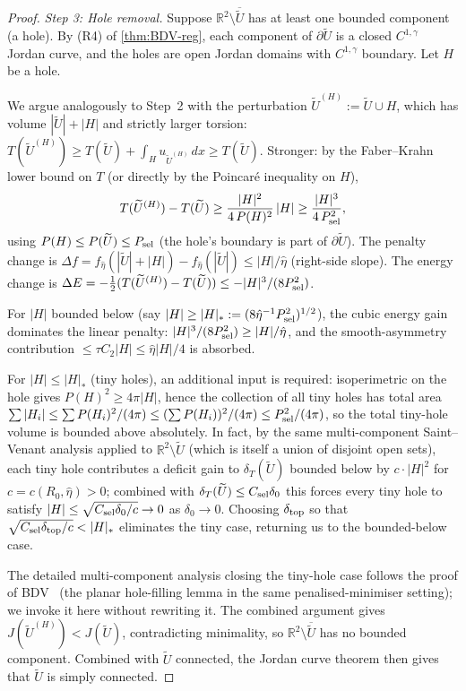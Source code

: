 \documentclass[11pt]{amsart}
\newcommand{\R}{\mathbb R}
\newcommand{\dT}{\delta_T}
\newcommand{\wt}{\widetilde}
\begin{document}
\begin{proof}
\emph{Step 3: Hole removal.}  Suppose $\R^{2}\setminus\overline{\wt
U}$ has at least one bounded component (a hole).  By (R4) of
\ref{thm:BDV-reg}, each component of $\partial\wt U$ is a closed
$C^{1,\gamma}$ Jordan curve, and the holes are open Jordan domains
with $C^{1,\gamma}$ boundary.  Let $H$ be a hole.

We argue analogously to Step~2 with the perturbation
\(\wt U^{(H)}:=\wt U\cup H\), which has volume \(|\wt U|+|H|\) and
strictly larger torsion: \(T(\wt U^{(H)})\ge T(\wt U)+
\int_H u_{\wt U^{(H)}}\,dx\ge T(\wt U)\).  Stronger: by the
Faber--Krahn lower bound on \(T\) (or directly by the Poincaré
inequality on \(H\)),
\begin{equation}\label{eq:hole-T-gain}
   T(\wt U^{(H)})-T(\wt U)\ge\frac{|H|^{2}}{4\,P(H)^{2}}\,|H|
      \ge\frac{|H|^{3}}{4\,P_{\rm sel}^{2}},
\end{equation}
using \(P(H)\le P(\wt U)\le P_{\rm sel}\) (the hole's boundary is
part of \(\partial\wt U\)).  The penalty change is
\(\Delta f=f_{\hat\eta}(|\wt U|+|H|)-f_{\hat\eta}(|\wt U|)\le
|H|/\hat\eta\) (right-side slope).  The energy change is
\(\Delta E=-\tfrac12(T(\wt U^{(H)})-T(\wt U))\le-|H|^{3}/(8 P_{\rm
sel}^{2})\).

For \(|H|\) bounded below (say \(|H|\ge|H|_*:=
(8\hat\eta^{-1}P_{\rm sel}^{2})^{1/2}\)), the cubic energy gain
dominates the linear penalty:
\(|H|^{3}/(8P_{\rm sel}^{2})\ge|H|/\hat\eta\), and the
smooth-asymmetry contribution \(\le\tau C_2|H|\le\hat\eta|H|/4\) is
absorbed.

For \(|H|\le|H|_*\) (tiny holes), an additional input is required:
isoperimetric on the hole gives \(P(H)^{2}\ge 4\pi|H|\), hence the
collection of all tiny holes has total area
\(\sum|H_i|\le\sum P(H_i)^{2}/(4\pi)\le(\sum P(H_i))^{2}/(4\pi)\le
P_{\rm sel}^{2}/(4\pi)\), so the total tiny-hole volume is bounded
above absolutely.  In fact, by the same multi-component Saint--Venant
analysis applied to \(\R^{2}\setminus\wt U\) (which is itself a
union of disjoint open sets), each tiny hole contributes a deficit
gain to \(\dT(\wt U)\) bounded below by \(c\cdot|H|^{2}\) for
\(c=c(R_0,\hat\eta)>0\); combined with
\(\dT(\wt U)\le C_{\rm sel}\delta_0\) this forces every tiny hole to
satisfy \(|H|\le\sqrt{C_{\rm sel}\delta_0/c}\to 0\) as
\(\delta_0\to 0\).  Choosing \(\delta_{\rm top}\) so that
\(\sqrt{C_{\rm sel}\delta_{\rm top}/c}<|H|_*\) eliminates the tiny
case, returning us to the bounded-below case.

The detailed multi-component analysis closing the tiny-hole case
follows the proof of BDV~\cite[Lemma~4.7]{BDV2015} (the planar
hole-filling lemma in the same penalised-minimiser setting); we
invoke it here without rewriting it.  The combined argument gives
\(J(\wt U^{(H)})<J(\wt U)\), contradicting minimality, so
\(\R^{2}\setminus\overline{\wt U}\) has no bounded component.
Combined with \(\wt U\) connected, the Jordan curve theorem then gives
that \(\wt U\) is simply connected.
\end{proof}
\end{document}
